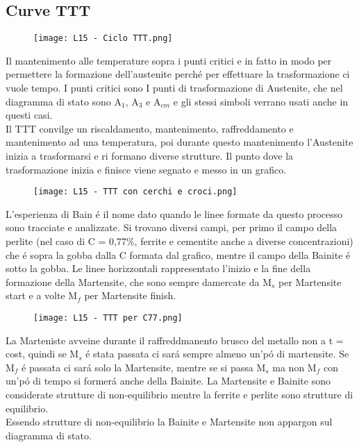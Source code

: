 \documentclass{article}
\begin{document}
{        \subsection{Curve TTT}
            \begin{figure}[h!]
                \centering
                \texttt{[image: L15 - Ciclo TTT.png]}
            \end{figure}
            Il mantenimento alle temperature sopra i punti critici e in fatto in modo per permettere la formazione dell'austenite perch\'e per effettuare la trasformazione ci vuole tempo. I punti critici sono I punti di trasformazione di Austenite, che nel diagramma di stato sono A$_1$, A$_3$ e A$_{cm}$ e gli stessi simboli verrano usati anche in questi casi.\\
            Il TTT convilge un riscaldamento, mantenimento, raffreddamento e mantenimento ad una temperatura, poi durante questo mantenimento l'Austenite inizia a trasformarsi e ri formano diverse strutture. Il punto dove la trasformazione inizia e finisce viene segnato e messo in un grafico.\\
            \newpage
            \begin{figure}[h!]
                \centering
                \texttt{[image: L15 - TTT con cerchi e croci.png]}
            \end{figure}
            L'esperienza di Bain \'e il nome dato quando le linee formate da questo processo sono tracciate e analizzate.  Si trovano diversi campi, per primo il campo della perlite (nel caso di C = 0,77$\%$, ferrite e cementite anche a diverse concentrazioni) che \'e sopra la gobba dalla C formata dal grafico, mentre il campo della Bainite \'e sotto la gobba. Le linee horizzontali rappresentato l'inizio e la fine della formazione della Martensite, che sono sempre damercate da M$_s$ per Martensite start e a volte M$_f$ per Martensite finish.\\
            \begin{figure}[h!]
                \centering
                \texttt{[image: L15 - TTT per C77.png]}
            \end{figure}
            La Marteniste avveine durante il raffreddmanento brusco del metallo non a t = cost, quindi se M$_s$ \'e stata passata ci sar\'a sempre almeno un'p\'o di martensite. Se M$_f$ \'e passata ci sar\'a solo la Martensite, mentre se si passa M$_s$ ma non M$_f$ con un'p\'o di tempo si former\'a anche della Bainite.
            La Martensite e Bainite sono considerate strutture di non-equilibrio mentre la ferrite e perlite sono strutture di equilibrio.\\
            Essendo strutture di non-equilibrio la Bainite e Martensite non appargon sul diagramma di stato.
}
\end{document}
